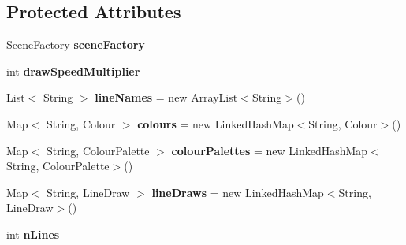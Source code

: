 \subsection*{Protected Attributes}
\begin{DoxyCompactItemize}
\item 
\hypertarget{classdev_1_1boxy_1_1fortyfive_1_1core_1_1scene_1_1_scene_a89674e45ddb3dd36b9caf82c758e9e80}{
\hyperlink{classdev_1_1boxy_1_1fortyfive_1_1core_1_1scene_1_1_scene_factory}{SceneFactory} {\bfseries sceneFactory}}
\label{d6/d2d/classdev_1_1boxy_1_1fortyfive_1_1core_1_1scene_1_1_scene_a89674e45ddb3dd36b9caf82c758e9e80}

\item 
\hypertarget{classdev_1_1boxy_1_1fortyfive_1_1core_1_1scene_1_1_scene_aaccd2ef319d3554da4393d1f0fd67e6c}{
int {\bfseries drawSpeedMultiplier}}
\label{d6/d2d/classdev_1_1boxy_1_1fortyfive_1_1core_1_1scene_1_1_scene_aaccd2ef319d3554da4393d1f0fd67e6c}

\item 
\hypertarget{classdev_1_1boxy_1_1fortyfive_1_1core_1_1scene_1_1_scene_adee2d7dff0be55771c5286256f57730e}{
List$<$ String $>$ {\bfseries lineNames} = new ArrayList$<$String$>$()}
\label{d6/d2d/classdev_1_1boxy_1_1fortyfive_1_1core_1_1scene_1_1_scene_adee2d7dff0be55771c5286256f57730e}

\item 
\hypertarget{classdev_1_1boxy_1_1fortyfive_1_1core_1_1scene_1_1_scene_a26bc4779886ea69c256e3b94b67f84ce}{
Map$<$ String, Colour $>$ {\bfseries colours} = new LinkedHashMap$<$String, Colour$>$()}
\label{d6/d2d/classdev_1_1boxy_1_1fortyfive_1_1core_1_1scene_1_1_scene_a26bc4779886ea69c256e3b94b67f84ce}

\item 
\hypertarget{classdev_1_1boxy_1_1fortyfive_1_1core_1_1scene_1_1_scene_a57af0310b5b30bd26a25e3b68a943c9f}{
Map$<$ String, ColourPalette $>$ {\bfseries colourPalettes} = new LinkedHashMap$<$String, ColourPalette$>$()}
\label{d6/d2d/classdev_1_1boxy_1_1fortyfive_1_1core_1_1scene_1_1_scene_a57af0310b5b30bd26a25e3b68a943c9f}

\item 
\hypertarget{classdev_1_1boxy_1_1fortyfive_1_1core_1_1scene_1_1_scene_a7634ed2beac08b6920749c940d50d0b6}{
Map$<$ String, LineDraw $>$ {\bfseries lineDraws} = new LinkedHashMap$<$String, LineDraw$>$()}
\label{d6/d2d/classdev_1_1boxy_1_1fortyfive_1_1core_1_1scene_1_1_scene_a7634ed2beac08b6920749c940d50d0b6}

\item 
\hypertarget{classdev_1_1boxy_1_1fortyfive_1_1core_1_1scene_1_1_scene_ae41796e307be5b18a08e99ae431a8363}{
int {\bfseries nLines}}
\label{d6/d2d/classdev_1_1boxy_1_1fortyfive_1_1core_1_1scene_1_1_scene_ae41796e307be5b18a08e99ae431a8363}


\end{DoxyCompactItemize}
